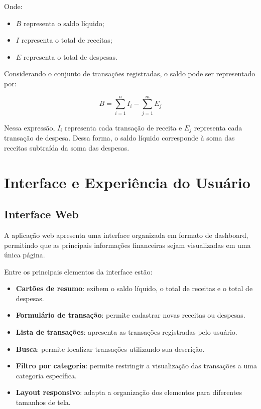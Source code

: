 \documentclass[12pt,a4paper]{article}
\begin{document}
Onde:

\begin{itemize}
    \item $B$ representa o saldo líquido;
    \item $I$ representa o total de receitas;
    \item $E$ representa o total de despesas.
\end{itemize}

Considerando o conjunto de transações registradas, o saldo pode ser representado por:

\begin{equation}
    B = \sum_{i=1}^{n} I_i - \sum_{j=1}^{m} E_j
    \label{eq:saldo-expandido}
\end{equation}

Nessa expressão, $I_i$ representa cada transação de receita e $E_j$ representa cada transação de despesa. Dessa forma, o saldo líquido corresponde à soma das receitas subtraída da soma das despesas.

\section{Interface e Experiência do Usuário}

\subsection{Interface Web}

A aplicação web apresenta uma interface organizada em formato de dashboard, permitindo que as principais informações financeiras sejam visualizadas em uma única página.

Entre os principais elementos da interface estão:

\begin{itemize}
    \item \textbf{Cartões de resumo}: exibem o saldo líquido, o total de receitas e o total de despesas.
    
    \item \textbf{Formulário de transação}: permite cadastrar novas receitas ou despesas.
    
    \item \textbf{Lista de transações}: apresenta as transações registradas pelo usuário.
    
    \item \textbf{Busca}: permite localizar transações utilizando sua descrição.
    
    \item \textbf{Filtro por categoria}: permite restringir a visualização das transações a uma categoria específica.
    
    \item \textbf{Layout responsivo}: adapta a organização dos elementos para diferentes tamanhos de tela.
\end{itemize}
\end{document}
